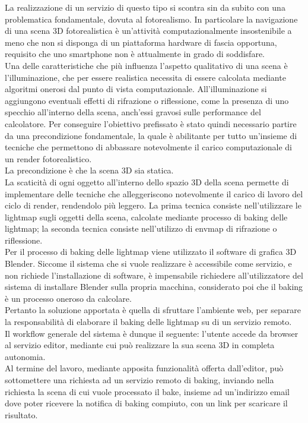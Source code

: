 La realizzazione di un servizio di questo tipo si scontra sin da subito con una problematica fondamentale, dovuta al fotorealismo. In particolare la navigazione di una scena 3D fotorealistica è un’attività computazionalmente insostenibile a meno che non si disponga di un piattaforma hardware di fascia opportuna, requisito che uno smartphone non è attualmente in grado di soddisfare. 
\\
Una delle caratteristiche che più influenza l’aspetto qualitativo di una scena è l’illuminazione, che per essere realistica necessita di essere calcolata mediante algoritmi onerosi dal punto di vista computazionale. All’illuminazione si aggiungono eventuali effetti di rifrazione o riflessione, come la presenza di uno specchio all’interno della scena, anch’essi gravosi sulle performance del calcolatore.
Per conseguire l’obiettivo prefissato è stato quindi necessario partire da una precondizione fondamentale, la quale è abilitante per tutto un’insieme di tecniche che permettono di abbassare notevolmente il carico computazionale di un render fotorealistico.
\\
La precondizione è che la scena 3D sia statica.
\\
La scaticità di ogni oggetto all’interno dello spazio 3D della scena permette di implementare delle tecniche che alleggeriscono notevolmente il carico di lavoro del ciclo di render, rendendolo più leggero. 
La prima tecnica consiste nell’utilizzare le lightmap sugli oggetti della scena, calcolate mediante processo di baking delle lightmap; la seconda tecnica consiste nell’utilizzo di envmap di rifrazione o riflessione. 
\\
Per il processo di baking delle lightmap viene utilizzato il software di grafica 3D Blender. Siccome il sistema che si vuole realizzare è accessibile come servizio, e non richiede l’installazione di software, è impensabile richiedere all’utilizzatore del sistema di installare Blender sulla propria macchina, considerato poi che il baking è un processo oneroso da calcolare.
\\
Pertanto la soluzione apportata è quella di sfruttare l’ambiente web, per separare la responsabilità di elaborare il baking delle lightmap su di un servizio remoto.
\\
Il workflow generale del sistema è dunque il seguente: l’utente accede da browser al servizio editor, mediante cui può realizzare la sua scena 3D in completa autonomia.
\\
Al termine del lavoro, mediante apposita funzionalità offerta dall’editor, può sottomettere una richiesta ad un servizio remoto di baking, inviando nella richiesta la scena di cui vuole processato il bake, insieme ad un’indirizzo email dove poter ricevere la notifica di baking compiuto, con un link per scaricare il risultato. 
